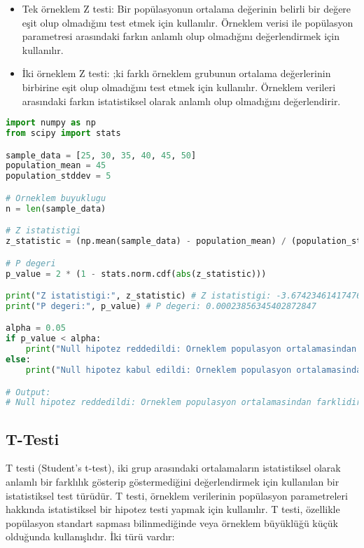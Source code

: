 \begin{itemize}
    \item Tek örneklem Z testi: Bir popülasyonun ortalama değerinin belirli bir değere eşit olup olmadığını test etmek için kullanılır. Örneklem verisi ile popülasyon parametresi arasındaki farkın anlamlı olup olmadığını değerlendirmek için kullanılır.
    \item İki örneklem Z testi: ;ki farklı örneklem grubunun ortalama değerlerinin birbirine eşit olup olmadığını test etmek için kullanılır. Örneklem verileri arasındaki farkın istatistiksel olarak anlamlı olup olmadığını değerlendirir.
\end{itemize}

\begin{lstlisting}[language=Python]
import numpy as np
from scipy import stats

sample_data = [25, 30, 35, 40, 45, 50]
population_mean = 45
population_stddev = 5

# Orneklem buyuklugu
n = len(sample_data)

# Z istatistigi
z_statistic = (np.mean(sample_data) - population_mean) / (population_stddev / np.sqrt(n))

# P degeri
p_value = 2 * (1 - stats.norm.cdf(abs(z_statistic)))

print("Z istatistigi:", z_statistic) # Z istatistigi: -3.674234614174767
print("P degeri:", p_value) # P degeri: 0.00023856345402872847

alpha = 0.05
if p_value < alpha:
    print("Null hipotez reddedildi: Orneklem populasyon ortalamasindan farklidir.")
else:
    print("Null hipotez kabul edildi: Orneklem populasyon ortalamasindan farkli degildir.")

# Output:
# Null hipotez reddedildi: Orneklem populasyon ortalamasindan farklidir.
\end{lstlisting}

\newpage

\subsection{T-Testi}
T testi (Student's t-test), iki grup arasındaki ortalamaların istatistiksel olarak anlamlı bir farklılık gösterip göstermediğini değerlendirmek için kullanılan bir istatistiksel test türüdür. T testi, örneklem verilerinin popülasyon parametreleri hakkında istatistiksel bir hipotez testi yapmak için kullanılır. T testi, özellikle popülasyon standart sapması bilinmediğinde veya örneklem büyüklüğü küçük olduğunda kullanışlıdır. İki türü vardır:

